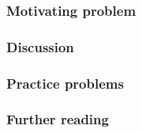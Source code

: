 \subsubsection*{Motivating problem}







\subsubsection*{Discussion}

\subsubsection*{Practice problems}

\subsubsection*{Further reading}

